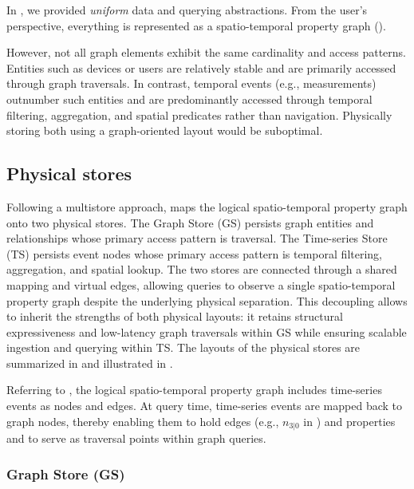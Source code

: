 In , we provided \emph{uniform} data and querying abstractions.
From the user's perspective, everything is represented as a spatio-temporal property graph ().

However, not all graph elements exhibit the same cardinality and access patterns.
Entities such as devices or users are relatively stable and are primarily accessed through graph traversals.
In contrast, temporal events (e.g., measurements) outnumber such entities and are predominantly accessed through temporal filtering, aggregation, and spatial predicates rather than navigation.
Physically storing both using a graph-oriented layout would be suboptimal.%

\subsection{Physical stores}
Following a multistore approach, \ourapproach maps the logical spatio-temporal property graph onto two physical stores.
The Graph Store (GS) persists graph entities and relationships whose primary access pattern is traversal.
The Time-series Store (TS) persists event nodes whose primary access pattern is temporal filtering, aggregation, and spatial lookup.
The two stores are connected through a shared mapping and virtual edges, allowing queries to observe a single spatio-temporal property graph despite the underlying physical separation.
This decoupling allows \ourapproach to inherit the strengths of both physical layouts: it retains structural expressiveness and low-latency graph traversals within GS while ensuring scalable ingestion and querying within TS.
The layouts of the physical stores are summarized in  and illustrated in .

Referring to , the logical spatio-temporal property graph includes time-series events as nodes and  edges. 
At query time, time-series events are mapped back to graph nodes, thereby enabling them to hold edges (e.g., $n_{3|0}$ in ) and properties and to serve as traversal points within graph queries.

\subsubsection{Graph Store (GS)}

